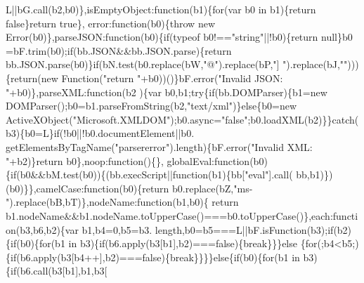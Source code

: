 \begin{DoxyCode}
      L||bG.call(b2,b0)\},isEmptyObject:\textcolor{keyword}{function}(b1)\{\textcolor{keywordflow}{for}(var b0 in b1)\{\textcolor{keywordflow}{return} \textcolor{keyword}{false}\}\textcolor{keywordflow}{return} \textcolor{keyword}{true}\},
      error:\textcolor{keyword}{function}(b0)\{\textcolor{keywordflow}{throw} \textcolor{keyword}{new} Error(b0)\},parseJSON:\textcolor{keyword}{function}(b0)\{\textcolor{keywordflow}{if}(typeof b0!==\textcolor{stringliteral}{"string"}||!b0)\{\textcolor{keywordflow}{return} null\}b0
      =bF.trim(b0);\textcolor{keywordflow}{if}(bb.JSON&&bb.JSON.parse)\{\textcolor{keywordflow}{return} bb.JSON.parse(b0)\}\textcolor{keywordflow}{if}(bN.test(b0.replace(bW,\textcolor{stringliteral}{"@"}).replace(bP,\textcolor{stringliteral}{"]
      "}).replace(bJ,\textcolor{stringliteral}{""})))\{\textcolor{keywordflow}{return}(\textcolor{keyword}{new} Function(\textcolor{stringliteral}{"return "}+b0))()\}bF.error(\textcolor{stringliteral}{"Invalid JSON: "}+b0)\},parseXML:\textcolor{keyword}{function}(b2
      )\{var b0,b1;\textcolor{keywordflow}{try}\{\textcolor{keywordflow}{if}(bb.DOMParser)\{b1=\textcolor{keyword}{new} DOMParser();b0=b1.parseFromString(b2,\textcolor{stringliteral}{"text/xml"})\}\textcolor{keywordflow}{else}\{b0=\textcolor{keyword}{new} 
      ActiveXObject(\textcolor{stringliteral}{"Microsoft.XMLDOM"});b0.async=\textcolor{stringliteral}{"false"};b0.loadXML(b2)\}\}\textcolor{keywordflow}{catch}(b3)\{b0=L\}\textcolor{keywordflow}{if}(!b0||!b0.documentElement||b0.
      getElementsByTagName(\textcolor{stringliteral}{"parsererror"}).length)\{bF.error(\textcolor{stringliteral}{"Invalid XML: "}+b2)\}\textcolor{keywordflow}{return} b0\},noop:\textcolor{keyword}{function}()\{\},
      globalEval:\textcolor{keyword}{function}(b0)\{\textcolor{keywordflow}{if}(b0&&bM.test(b0))\{(bb.execScript||\textcolor{keyword}{function}(b1)\{bb[\textcolor{stringliteral}{"eval"}].call(
      bb,b1)\})(b0)\}\},camelCase:\textcolor{keyword}{function}(b0)\{\textcolor{keywordflow}{return} b0.replace(bZ,\textcolor{stringliteral}{"ms-"}).replace(bB,bT)\},nodeName:\textcolor{keyword}{function}(b1,b0)\{\textcolor{keywordflow}{
      return} b1.nodeName&&b1.nodeName.toUpperCase()===b0.toUpperCase()\},each:\textcolor{keyword}{function}(b3,b6,b2)\{var b1,b4=0,b5=b3.
      length,b0=b5===L||bF.isFunction(b3);\textcolor{keywordflow}{if}(b2)\{\textcolor{keywordflow}{if}(b0)\{\textcolor{keywordflow}{for}(b1 in b3)\{\textcolor{keywordflow}{if}(b6.apply(b3[b1],b2)===\textcolor{keyword}{false})\{\textcolor{keywordflow}{break}\}\}\}\textcolor{keywordflow}{else}
      \{\textcolor{keywordflow}{for}(;b4<b5;)\{\textcolor{keywordflow}{if}(b6.apply(b3[b4++],b2)===\textcolor{keyword}{false})\{\textcolor{keywordflow}{break}\}\}\}\}\textcolor{keywordflow}{else}\{\textcolor{keywordflow}{if}(b0)\{\textcolor{keywordflow}{for}(b1 in b3)\{\textcolor{keywordflow}{if}(b6.call(b3[b1],b1,b3[

\end{DoxyCode}
